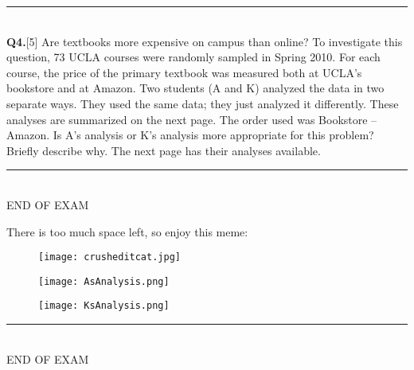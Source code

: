 \documentclass[12pt, oneside]{article}
\newcommand{\noi}{\noindent}
\begin{document}



\noi
\rule{7.5in}{.02in} \\

\noi
{\bf Q4.}[5] Are textbooks more expensive on campus than online? To investigate this question, 73 UCLA courses were randomly sampled in Spring 2010. For each course, the price of the primary textbook was measured both at UCLA’s bookstore and at Amazon. Two students (A and K) analyzed the data in two separate ways. They used the same data; they just analyzed it differently. These analyses are summarized on the next page. The order used was Bookstore – Amazon. Is A's analysis or K's analysis more appropriate for this problem? Briefly describe why. The next page has their analyses available.\\

\vspace{2in}
\noi
\rule{7.5in}{.02in} \\
END OF EXAM

\noi
There is too much space left, so enjoy this meme:

\begin{figure}[h!]
\centering
\texttt{[image: crusheditcat.jpg]}
\end{figure}

\pagebreak

\begin{figure}[h!]
\centering
\texttt{[image: AsAnalysis.png]}
\end{figure}

\begin{figure}[h!]
\centering
\texttt{[image: KsAnalysis.png]}
\end{figure}
\vspace{.05in}

\vfill
\noi
\rule{7.5in}{.02in} \\
END OF EXAM
\end{document}
